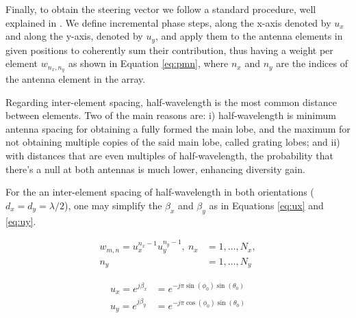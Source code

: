 \begin{comment}
For conciseness, the azimuth and elevation referred in the rest of the document are always the relative variants, but this will be repeated in the appropriate sections to avoid confusion.
\end{comment}

Finally, to obtain the steering vector we follow a standard procedure, well explained in \cite{7925023}. We define incremental phase steps, along the x-axis denoted by $u_x$ and along the y-axis, denoted by $u_y$, and apply them to the antenna elements in given positions to coherently sum their contribution, thus having a weight per element $w_{n_x,n_y}$ as shown in Equation \eqref{eq:pmn}, where $n_x$ and $n_y$ are the indices of the antenna element in the array.

Regarding inter-element spacing, half-wavelength is the most common distance between elements. Two of the main reasons are: i) half-wavelength is minimum antenna spacing for obtaining a fully formed the main lobe, and the maximum for not obtaining multiple copies of the said main lobe, called grating lobes; and ii) with distances that are even multiples of half-wavelength, the probability that there's a null at both antennas is much lower, enhancing diversity gain.

For the an inter-element spacing of half-wavelength in both orientations ($d_x = d_y = \lambda/2$), one may simplify the $\beta_x$ and $\beta_y$ as in Equations \eqref{eq:ux} and \eqref{eq:uy}.

\begin{align}
    w_{m,n} = u_x^{n_x-1} u_y^{n_y-1}, \ n_x &= 1, \dots, N_x, \label{eq:pmn} \\
    n_y &= 1, \dots, N_y \nonumber
\end{align}
\vspace{-2cm}


\begin{align}
    u_x = e^{j \beta_x} &= e^{-j \pi \sin(\phi_0) \sin(\theta_0)} \label{eq:ux} \\
    u_y = e^{j \beta_y} &= e^{-j \pi \cos(\phi_0) \sin(\theta_0)} \label{eq:uy}
\end{align}


\begin{comment}
\begin{align}
    u_y = e^{j \beta_y} &= e^{-j \pi \sin({\phi_r}_0) \cos({\theta_r}_0)} \label{eq:ux} \\
    u_z = e^{j \beta_z} &= e^{j \pi \cos({\phi_r}_0) \cos({\theta_r}_0)} \label{eq:uy}
\end{align}

\end{comment}

